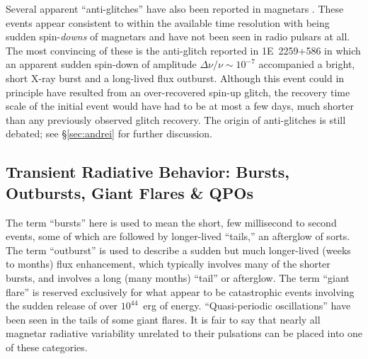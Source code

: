 Several apparent ``anti-glitches'' have also been reported in magnetars
\citep{wkv+99,sag14}.
These events appear consistent to within the available time resolution with being sudden spin-{\it downs}  of magnetars
and have not been seen in radio pulsars at all.  The most convincing of these 
is the anti-glitch reported in 
1E~2259+586 \citep{akn+13} in which an apparent sudden spin-down of amplitude $\Delta\nu/\nu \sim 10^{-7}$ accompanied
a bright, short X-ray burst and a long-lived flux outburst.  Although this event could in principle have resulted from
an over-recovered spin-up glitch, the recovery time scale of the initial event would have had to be at most a few days, much shorter than
any previously observed glitch recovery.  
The origin of anti-glitches is still debated; see \S\ref{sec:andrei} for further discussion.



\subsection{Transient Radiative Behavior: Bursts, Outbursts, Giant Flares \& QPOs}
\label{sec:transient}

The term ``bursts'' here is used to mean the short, few millisecond to
second events, some of which are followed by longer-lived ``tails,'' an afterglow
of sorts.  The term ``outburst'' is used to describe a sudden but much longer-lived
(weeks to months) flux enhancement, which typically involves many of the shorter
bursts, and involves a long (many months) ``tail'' or afterglow.
The term ``giant flare'' is reserved exclusively for what appear to be catastrophic
events involving the sudden release of over $10^{44}$~erg of energy.
``Quasi-periodic oscillations'' have been seen in the tails of some giant flares.
It is fair to say that nearly all magnetar radiative variability unrelated
to their pulsations can be placed into one of these categories.

